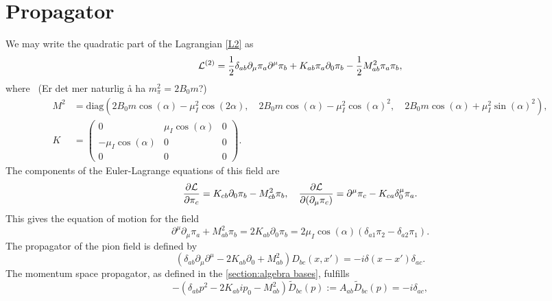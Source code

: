 \documentclass{article}
\begin{document}
\section{Propagator}

We may write the quadratic part of the Lagrangian \autoref{L2} as 
\begin{align}
    \mathcal{L}^{(2)}
    =
    \frac{1}{2} \delta_{ab} \partial_\mu \pi_a \partial^\mu \pi_b
    + K_{ab} \pi_a \partial_0 \pi_b
    - \frac{1}{2} M^2_{ab} \pi_a \pi_b,
\end{align}
where  (Er det mer naturlig å ha $m_\pi^2 = 2 B_0 m$?)
\begin{align*}
    M^2 & = \mathrm{diag} 
    \left(
        2 B_0 m \cos(\alpha) - \mu_I^2 \cos(2\alpha),\quad 
        2 B_0 m \cos(\alpha) - \mu_I^2 \cos(\alpha)^2,\quad
        2 B_0 m \cos(\alpha) + \mu_I^2 \sin(\alpha)^2
    \right),
    \\
    K & =
    \begin{pmatrix}
        0 & \mu_I\cos(\alpha) & 0 \\
        -\mu_I\cos(\alpha) & 0 & 0 \\
        0 & 0 & 0
    \end{pmatrix}.
\end{align*}
The components of the Euler-Lagrange equations of this field are
\begin{equation*}
    \pdv{\mathcal{L}}{\pi_c} = K_{cb} \partial_0 \pi_b - M^2_{cb} \pi_b, \quad
    \pdv{\mathcal{L}}{(\partial_\mu \pi_c)} = \partial^\mu \pi_c - K_{ca}\delta^\mu_0 \pi_a.
\end{equation*}
This gives the equation of motion for the field
\begin{equation}
    \partial^\mu \partial_\mu \pi_a + M^2_{a b} \pi_b 
    = 2 K_{ab}\partial_0 \pi_b 
    = 2 \mu_I \cos(\alpha) (\delta_{a1}\pi_2 - \delta_{a2}\pi_1).
\end{equation}
The propagator of the pion field is defined by
\begin{equation}
    \left(
        \delta_{ab}\partial_\mu\partial^\mu - 2 K_{ab} \partial_0 + M^2_{ab} 
    \right) D_{bc}(x, x') 
    = -i \delta(x - x') \delta_{ac}.
\end{equation}
The momentum space propagator, as defined in the \autoref{section:algebra bases}, fulfills
\begin{equation*}
    -(\delta_{ab}p^2 - 2 K_{ab} i p_0 - M_{ab}^2) \tilde D_{bc}(p) 
    := A_{ab} \tilde D_{bc}(p) = -i \delta_{ac},
\end{equation*}
\end{document}
